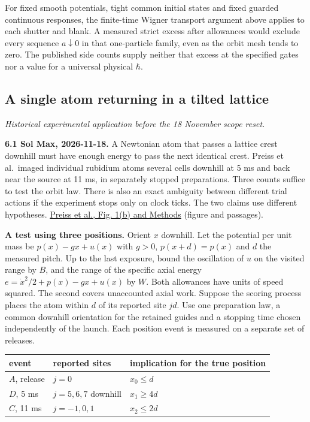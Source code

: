 \documentclass[11pt,a4paper]{article}
\begin{document}
For fixed smooth potentials, tight common initial states and fixed
guarded continuous responses, the finite-time Wigner transport argument
above applies to each shutter and blank. A measured strict excess after
allowances would exclude every sequence \(a\downarrow0\) in that
one-particle family, even as the orbit mesh tends to zero. The published
side counts supply neither that excess at the specified gates nor a
value for a universal physical \(\hbar\).

\subsection{A single atom returning in a tilted
lattice}\label{a-single-atom-returning-in-a-tilted-lattice}

\emph{Historical experimental application before the 18 November scope
reset.}

\textbf{6.1 Sol Max, 2026-11-18.} A Newtonian atom that passes a lattice
crest downhill must have enough energy to pass the next identical crest.
Preiss et al.~imaged individual rubidium atoms several cells downhill at
5 ms and back near the source at 11 ms, in separately stopped
preparations. Three counts suffice to test the orbit law. There is also
an exact ambiguity between different trial actions if the experiment
stops only on clock ticks. The two claims use different hypotheses.
\href{https://arxiv.org/pdf/1409.3100v2}{Preiss et al., Fig. 1(b) and
Methods} (figure and passages).

\textbf{A test using three positions.} Orient \(x\) downhill. Let the
potential per unit mass be \(p(x)-g x+u(x)\) with \(g>0\),
\(p(x+d)=p(x)\) and \(d\) the measured pitch. Up to the last exposure,
bound the oscillation of \(u\) on the visited range by \(B\), and the
range of the specific axial energy \(e=\dot x^2/2+p(x)-g x+u(x)\) by
\(W\). Both allowances have units of speed squared. The second covers
unaccounted axial work. Suppose the scoring process places the atom
within \(d\) of its reported site \(jd\). Use one preparation law, a
common downhill orientation for the retained guides and a stopping time
chosen independently of the launch. Each position event is measured on a
separate set of releases.

\begin{longtable}[]{@{}lll@{}}
\toprule\noalign{}
event & reported sites & implication for the true position \\
\midrule\noalign{}
\endhead
\bottomrule\noalign{}
\endlastfoot
\(A\), release & \(j=0\) & \(x_0\le d\) \\
\(D\), 5 ms & \(j=5,6,7\) downhill & \(x_1\ge4d\) \\
\(C\), 11 ms & \(j=-1,0,1\) & \(x_2\le2d\) \\
\end{longtable}
\end{document}
